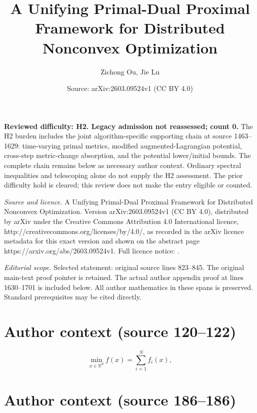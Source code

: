 \documentclass[10pt,a4paper]{amsart}
\title[Author proof 196070]{\LARGE \bf A Unifying Primal-Dual Proximal Framework for Distributed Nonconvex Optimization}
\author{Zichong Ou, Jie Lu}
\date{Source: arXiv:2603.09524v1 (CC BY 4.0)}
\begin{document}
\maketitle
\noindent\textbf{Reviewed difficulty: H2. Legacy admission not reassessed; count 0.} The H2 burden includes the joint algorithm-specific supporting chain at source 1463--1629: time-varying primal metrics, modified augmented-Lagrangian potential, cross-step metric-change absorption, and the potential lower/initial bounds. The complete chain remains below as necessary author context. Ordinary spectral inequalities and telescoping alone do not supply the H2 assessment. The prior difficulty hold is cleared; this review does not make the entry eligible or counted.\par\medskip

\noindent\emph{Source and licence.} A Unifying Primal-Dual Proximal Framework for Distributed Nonconvex Optimization. Version arXiv:2603.09524v1 (CC BY 4.0), distributed by arXiv under the Creative Commons Attribution 4.0 International licence, http://creativecommons.org/licenses/by/4.0/, as recorded in the arXiv licence metadata for this exact version and shown on the abstract page https://arxiv.org/abs/2603.09524v1. Full licence notice: .\par\smallskip

\noindent\textit{Editorial scope.} Selected statement: original source lines 823--845. The original main-text proof pointer is retained. The actual author appendix proof at lines 1630--1701 is included below. All author mathematics in these spans is preserved. Standard prerequisites may be cited directly.\par\smallskip

\small

\section*{Author context (source 120--122)}

\begin{equation}
\min _{x \in \mathbb{R}^{d}} f(x)= \sum_{i=1}^{N} f_{i}(x), \label{p1}
\end{equation}


\section*{Author context (source 186--186)}
\end{document}
